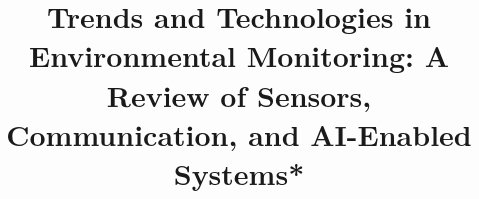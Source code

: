 
% 
% 



% 
\documentclass[conference,onecolumn,a4paper,12pt,english,nofonttune]{IEEEtran}
\IEEEoverridecommandlockouts

\usepackage[a4paper, margin=2.5cm]{geometry} %
\usepackage{setspace} %
\usepackage{cite}
\usepackage{amsmath,amssymb,amsfonts}
\usepackage{algorithmic}
\usepackage{graphicx}
\usepackage{textcomp}
\usepackage{xcolor}
\def\BibTeX{{\rm B\kern-.05em{\sc i\kern-.025em b}\kern-.08em
    T\kern-.1667em\lower.7ex\hbox{E}\kern-.125emX}}

\doublespacing
    


\title{Trends and Technologies in Environmental Monitoring: A Review of Sensors, Communication, and AI-Enabled Systems*}

\thanks{This work was supported by the National Council for Scientific and Technological Development (CNPq).}

\vspace{30pt}
\author{}
\vspace{30pt}

